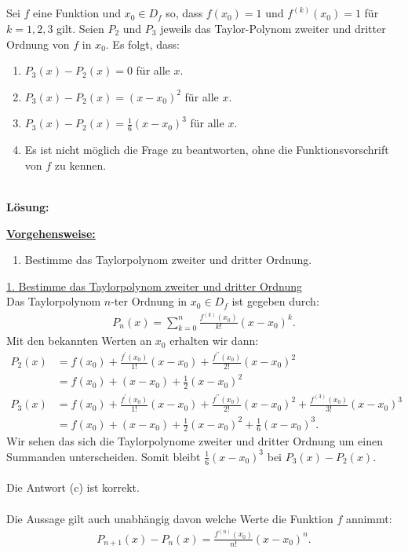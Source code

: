 \subsection*{}
Sei $f$ eine Funktion und $x_0 \in D_f$ so, dass $f(x_0) = 1$ und $f^{(k)}(x_0) = 1$ für $k = 1,2,3$ gilt. Seien $P_2$ und $P_3$ jeweils das Taylor-Polynom zweiter und dritter Ordnung von $f$ in $x_0$. Es folgt, dass:
\renewcommand{\labelenumi}{(\alph{enumi})}
\begin{enumerate}
	\item 
	$P_3(x) - P_2(x) = 0 $ für alle $x$.
	\item
	$P_3(x) - P_2(x) = (x - x_0)^2 $ für alle $x$.
	\item
	$P_3(x) - P_2(x) = \frac{1}{6} (x - x_0)^3 $ für alle $x$.
	\item
	Es ist nicht möglich die Frage zu beantworten, ohne die Funktionsvorschrift von $f$ zu kennen.
\end{enumerate}
\ \\
\textbf{Lösung:}
\begin{mdframed}
	\underline{\textbf{Vorgehensweise:}}
	\renewcommand{\labelenumi}{\theenumi.}
	\begin{enumerate}
		\item Bestimme das Taylorpolynom zweiter und dritter Ordnung.
	\end{enumerate}
\end{mdframed}

\underline{1. Bestimme das Taylorpolynom zweiter und dritter Ordnung}\\
Das Taylorpolynom $n$-ter Ordnung in $x_0 \in D_f$ ist gegeben durch:
\begin{align*}
	P_n(x)
	=
	\sum \limits_{k=0}^n \frac{f^{(k)}(x_0)}{k!} (x-x_0)^k.
\end{align*}
Mit den bekannten Werten an $x_0$ erhalten wir dann:
\begin{align*}
	P_2(x)
	&=
	f(x_0) + \frac{f^\prime(x_0)}{1!} (x- x_0) + \frac{f^{\prime \prime}(x_0)}{2!} (x- x_0)^2\\
	&=
	f(x_0) +  (x- x_0) + \frac{1}{2} (x- x_0)^2\\
	P_3(x)
	&=
	f(x_0) + \frac{f^\prime(x_0)}{1!} (x- x_0) + \frac{f^{\prime \prime}(x_0)}{2!} (x- x_0)^2
	+ \frac{f^{(3)}(x_0)}{3!} (x - x_0)^3\\
	&=
	f(x_0) +  (x- x_0) + \frac{1}{2} (x- x_0)^2 + \frac{1}{6} (x - x_0 )^3.
\end{align*}
Wir sehen das sich die Taylorpolynome zweiter und dritter Ordnung um einen Summanden unterscheiden. Somit bleibt $\frac{1}{6} (x - x_0)^3$ bei $P_3(x) - P_2(x)$.\\
\\
Die Antwort (c) ist korrekt.\\
\\
Die Aussage gilt auch unabhängig davon welche Werte die Funktion $f$ annimmt:
\begin{align*}
	P_{n+1}(x) - P_n(x) = 
	\frac{f^{(n)}(x_0)}{n!}(x - x_0)^n. 
\end{align*} 


